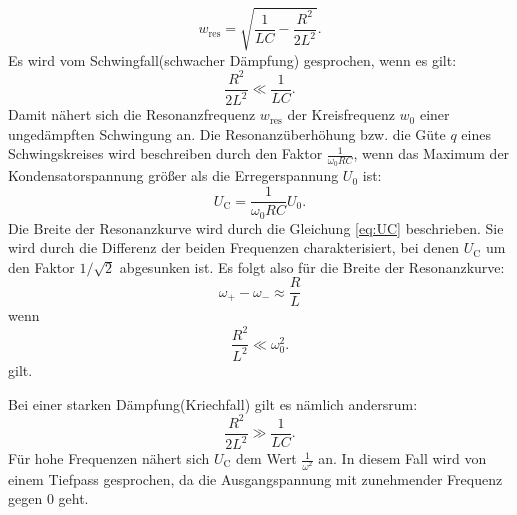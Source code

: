 \begin{equation*}
w_{\text{res}} = \sqrt{\frac{1}{LC}-\frac{R^{2}}{2L^{2}}}.
\end{equation*}
Es wird vom Schwingfall(schwacher Dämpfung) gesprochen, wenn es gilt:
\begin{equation*}
\frac{R^{2}}{2L^{2}} \ll \frac{1}{LC}.
\end{equation*}
Damit nähert sich die Resonanzfrequenz $w_{\text{res}}$ der Kreisfrequenz $w_{0}$ einer ungedämpften Schwingung an. Die Resonanzüberhöhung bzw. die Güte $q$ eines Schwingskreises wird beschreiben durch den Faktor $\frac{1}{\omega_{0}RC}$, wenn das Maximum der Kondensatorspannung größer als die Erregerspannung $U_{0}$ ist:
\begin{equation*}
U_\text{C} = \frac{1}{\omega_{0}RC}U_{0}.
\end{equation*}
Die Breite der Resonanzkurve wird durch die Gleichung \ref{eq:UC} beschrieben. Sie wird durch die Differenz der beiden Frequenzen charakterisiert, bei denen $U_{\text{C}}$ um den Faktor $1/\sqrt{2}$ abgesunken ist. Es folgt also für die Breite der Resonanzkurve:
\begin{equation*}
\omega_{+} - \omega_{-} \approx \frac{R}{L}
\end{equation*}
wenn
\begin{equation*}
\frac{R^{2}}{L^{2}} \ll \omega_{0}^{2}.
\end{equation*}
gilt.

Bei einer starken Dämpfung(Kriechfall) gilt es nämlich andersrum:
\begin{equation*}
\frac{R^{2}}{2L^{2}} \gg \frac{1}{LC}.
\end{equation*}
Für hohe Frequenzen nähert sich $U_\text{C}$ dem Wert $\frac{1}{\omega^{2}}$ an. In diesem Fall wird von einem Tiefpass gesprochen, da die Ausgangspannung mit zunehmender Frequenz gegen 0 geht.
